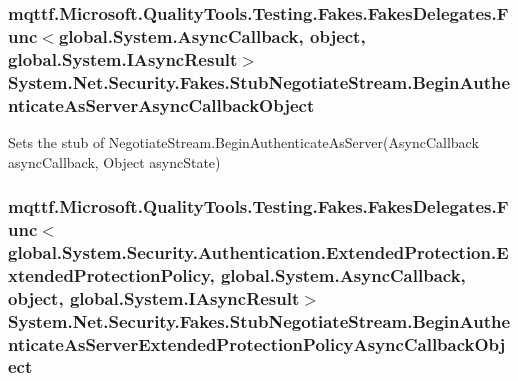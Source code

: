 \hypertarget{class_system_1_1_net_1_1_security_1_1_fakes_1_1_stub_negotiate_stream_ae224f971204ea772a44f7028afa30318}{
\subsubsection[{Begin\-Authenticate\-As\-Server\-Async\-Callback\-Object}]{\setlength{\rightskip}{0pt plus 5cm}mqttf.\-Microsoft.\-Quality\-Tools.\-Testing.\-Fakes.\-Fakes\-Delegates.\-Func$<$global.\-System.\-Async\-Callback, object, global.\-System.\-I\-Async\-Result$>$ System.\-Net.\-Security.\-Fakes.\-Stub\-Negotiate\-Stream.\-Begin\-Authenticate\-As\-Server\-Async\-Callback\-Object}}\label{class_system_1_1_net_1_1_security_1_1_fakes_1_1_stub_negotiate_stream_ae224f971204ea772a44f7028afa30318}


Sets the stub of Negotiate\-Stream.\-Begin\-Authenticate\-As\-Server(\-Async\-Callback async\-Callback, Object async\-State)

\hypertarget{class_system_1_1_net_1_1_security_1_1_fakes_1_1_stub_negotiate_stream_a8d4beff7026a487ca05e8f4385e91975}{
\subsubsection[{Begin\-Authenticate\-As\-Server\-Extended\-Protection\-Policy\-Async\-Callback\-Object}]{\setlength{\rightskip}{0pt plus 5cm}mqttf.\-Microsoft.\-Quality\-Tools.\-Testing.\-Fakes.\-Fakes\-Delegates.\-Func$<$global.\-System.\-Security.\-Authentication.\-Extended\-Protection.\-Extended\-Protection\-Policy, global.\-System.\-Async\-Callback, object, global.\-System.\-I\-Async\-Result$>$ System.\-Net.\-Security.\-Fakes.\-Stub\-Negotiate\-Stream.\-Begin\-Authenticate\-As\-Server\-Extended\-Protection\-Policy\-Async\-Callback\-Object}}\label{class_system_1_1_net_1_1_security_1_1_fakes_1_1_stub_negotiate_stream_a8d4beff7026a487ca05e8f4385e91975}


